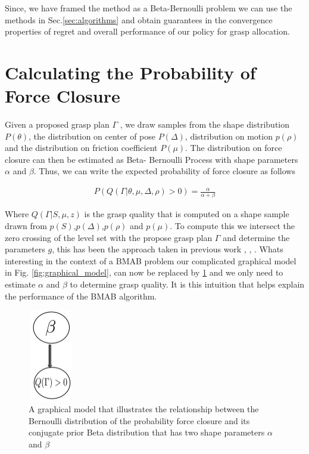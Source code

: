 \documentclass[letterpaper, 10 pt, conference]{ieeeconf}  %
\begin{document}
Since, we have framed the method as a Beta-Bernoulli problem we can use the methods in Sec.\ref{sec:algorithms} and obtain guarantees in the convergence properties of regret and overall performance of our policy for grasp allocation. 





\section{Calculating the Probability of Force Closure}
Given a proposed grasp plan $\Gamma$ , we draw samples from the shape distribution $P (\theta )$, the distribution on center of pose $P (\Delta)$, distribution on motion $p(\rho)$ and the distribution on friction coefficient $P (\mu)$. The distribution on force closure can then be estimated as Beta- Bernoulli Process with shape parameters $\alpha$ and $\beta$. Thus, we can write the expected probability of force closure as follows


\vspace{-2ex}
\begin{align}\label{eq:shape_sampling}
P(Q(\Gamma|\theta,\mu,\Delta,\rho) > 0) = \frac{\alpha}{\alpha + \beta}
\end{align}

Where $Q(\Gamma|S,\mu,z)$ is the grasp quality that is computed on a shape sample drawn from $p(S)$,$p(\Delta)$,$p(\rho)$ and $p(\mu)$. To compute this we intersect the zero crossing of the level set with the propose grasp plan $\Gamma$ and determine the parameters $g$, this has been the approach taken in previous work  \cite{kehoe2012estimating}, \cite{kehoe2012toward},  \cite{christopoulos2007handling}. Whats interesting in the context of a BMAB problem our complicated graphical model in Fig. \ref{fig:graphical_model}, can now be replaced by \ref{fig:beta_model} and we only need to estimate $\alpha$ and $\beta$ to determine grasp quality. It is this intuition that helps explain the performance of the BMAB algorithm. 

\begin{figure}[ht!]
\centering
\includegraphics[width = 2cm, height = 4cm]{figures/Slide9.jpg}
\caption{A graphical model that illustrates the relationship between the Bernoulli distribution of the probability force closure and its conjugate prior Beta distribution that has two shape parameters $\alpha$ and $\beta$ }
\vspace*{-10pt}
\label{fig:beta_model}
\end{figure}
\end{document}
